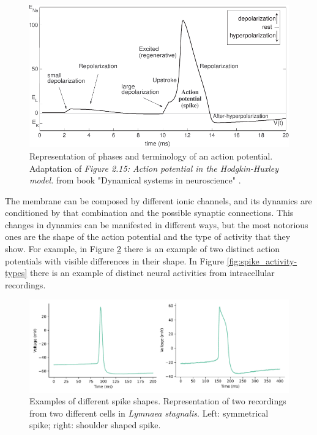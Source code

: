 \begin{figure}[htb!]
    \centering
    \includegraphics[width=\linewidth]{img/intro/dns_spike_phases.pdf}
    \caption{Representation of phases and terminology of an action potential. Adaptation of \textit{Figure 2.15: Action potential in the Hodgkin-Huxley model.} from book "Dynamical systems in neuroscience" \cite{izhikevich_dynamical_2007}. }
    \label{fig:action potential}
\end{figure}
The membrane can be composed by different ionic channels, and its dynamics are conditioned by that combination and the possible synaptic connections. This changes in dynamics can be manifested in different ways, but the most notorious ones are the shape of the action potential and the type of activity that they show. %
For example, in Figure \ref{fig:spike-types} there is an example of two distinct action potentials with visible differences in their shape. In Figure \ref{fig:spike_activity-types} there is an example of distinct neural activities from intracellular recordings. 
\begin{figure}[htb!]
    \centering
    \includegraphics[width=\linewidth]{img/intro/spike-types.pdf}
    \caption{Examples of different spike shapes. Representation of two recordings from two different cells in \textit{Lymnaea stagnalis}. Left: symmetrical spike; right: shoulder shaped spike.}
    \label{fig:spike-types}
\end{figure}
